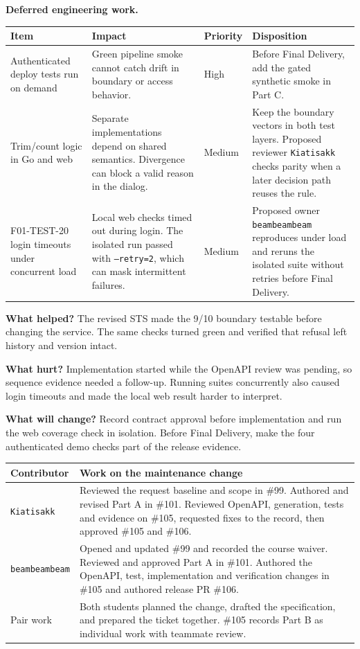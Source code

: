 \textbf{Deferred engineering work.}
\begin{longtable}{@{}R{3.5cm}R{6.1cm}R{2cm}R{4cm}@{}}
\toprule
\textbf{Item} & \textbf{Impact} & \textbf{Priority} & \textbf{Disposition} \\ \midrule \endhead
Authenticated deploy tests run on demand & Green pipeline smoke cannot catch drift in boundary or access behavior. & High & Before Final Delivery, add the gated synthetic smoke in Part C. \\
Trim/count logic in Go and web & Separate implementations depend on shared semantics. Divergence can block a valid reason in the dialog. & Medium & Keep the boundary vectors in both test layers. Proposed reviewer \texttt{Kiatisakk} checks parity when a later decision path reuses the rule. \\
F01-TEST-20 login timeouts under concurrent load & Local web checks timed out during login. The isolated run passed with \texttt{--retry=2}, which can mask intermittent failures. & Medium & Proposed owner \texttt{beambeambeam} reproduces under load and reruns the isolated suite without retries before Final Delivery. \\
\bottomrule
\end{longtable}

\clearpage
{}
\textbf{What helped?}
The revised STS made the 9/10 boundary testable before changing the service. The same checks turned green and verified that refusal left history and version intact.

\textbf{What hurt?}
Implementation started while the OpenAPI review was pending, so sequence evidence needed a follow-up. Running suites concurrently also caused login timeouts and made the local web result harder to interpret.

\textbf{What will change?}
Record contract approval before implementation and run the web coverage check in isolation. Before Final Delivery, make the four authenticated demo checks part of the release evidence.

\begin{longtable}{@{}R{4cm}R{12.1cm}@{}}
\toprule
\textbf{Contributor} & \textbf{Work on the maintenance change} \\ \midrule \endhead
\texttt{Kiatisakk} & Reviewed the request baseline and scope in \#99. Authored and revised Part A in \#101. Reviewed OpenAPI, generation, tests and evidence on \#105, requested fixes to the record, then approved \#105 and \#106. \\
\texttt{beambeambeam} & Opened and updated \#99 and recorded the course waiver. Reviewed and approved Part A in \#101. Authored the OpenAPI, test, implementation and verification changes in \#105 and authored release PR \#106. \\
Pair work & Both students planned the change, drafted the specification, and prepared the ticket together. \#105 records Part B as individual work with teammate review. \\
\bottomrule
\end{longtable}

